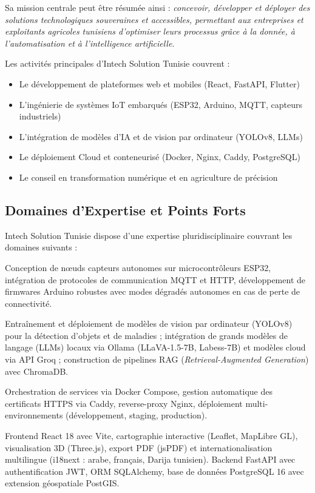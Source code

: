 \documentclass[12pt, a4paper]{report}
\begin{document}
Sa mission centrale peut être résumée ainsi : \textit{concevoir, développer et déployer des solutions technologiques souveraines et accessibles, permettant aux entreprises et exploitants agricoles tunisiens d'optimiser leurs processus grâce à la donnée, à l'automatisation et à l'intelligence artificielle}.

Les activités principales d'Intech Solution Tunisie couvrent :
\begin{itemize}[leftmargin=*, label=\textcolor{primary}{$\bullet$}]
    \item Le développement de plateformes web et mobiles (React, FastAPI, Flutter)
    \item L'ingénierie de systèmes IoT embarqués (ESP32, Arduino, MQTT, capteurs industriels)
    \item L'intégration de modèles d'IA et de vision par ordinateur (YOLOv8, LLMs)
    \item Le déploiement Cloud et conteneurisé (Docker, Nginx, Caddy, PostgreSQL)
    \item Le conseil en transformation numérique et en agriculture de précision
\end{itemize}

\subsection{Domaines d'Expertise et Points Forts}

Intech Solution Tunisie dispose d'une expertise pluridisciplinaire couvrant les domaines suivants :

\begin{description}[leftmargin=2cm, font=\textcolor{primary}\bfseries]
    \item[IoT \& Systèmes Embarqués :] Conception de nœuds capteurs autonomes sur microcontrôleurs ESP32, intégration de protocoles de communication MQTT et HTTP, développement de firmwares Arduino robustes avec modes dégradés autonomes en cas de perte de connectivité.

    \item[Intelligence Artificielle :] Entraînement et déploiement de modèles de vision par ordinateur (YOLOv8) pour la détection d'objets et de maladies ; intégration de grands modèles de langage (LLMs) locaux via Ollama (LLaVA-1.5-7B, Labess-7B) et modèles cloud via API Groq ; construction de pipelines RAG (\textit{Retrieval-Augmented Generation}) avec ChromaDB.

    \item[Cloud \& DevOps :] Orchestration de services via Docker Compose, gestion automatique des certificats HTTPS via Caddy, reverse-proxy Nginx, déploiement multi-environnements (développement, staging, production).

    \item[Développement Web Full-Stack :] Frontend React 18 avec Vite, cartographie interactive (Leaflet, MapLibre GL), visualisation 3D (Three.js), export PDF (jsPDF) et internationalisation multilingue (i18next : arabe, français, Darija tunisien). Backend FastAPI avec authentification JWT, ORM SQLAlchemy, base de données PostgreSQL 16 avec extension géospatiale PostGIS.
\end{description}
\end{document}
